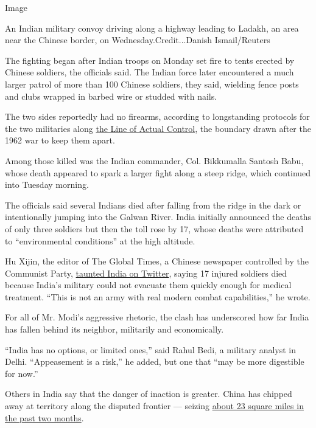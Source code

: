 Image

An Indian military convoy driving along a highway leading to Ladakh, an
area near the Chinese border, on Wednesday.Credit...Danish
Ismail/Reuters

The fighting began after Indian troops on Monday set fire to tents
erected by Chinese soldiers, the officials said. The Indian force later
encountered a much larger patrol of more than 100 Chinese soldiers, they
said, wielding fence posts and clubs wrapped in barbed wire or studded
with nails.

The two sides reportedly had no firearms, according to longstanding
protocols for the two militaries along
\href{https://www.nytimes.com/2020/06/16/world/asia/india-china-border.html}{the
Line of Actual Control}, the boundary drawn after the 1962 war to keep
them apart.

Among those killed was the Indian commander, Col. Bikkumalla Santosh
Babu, whose death appeared to spark a larger fight along a steep ridge,
which continued into Tuesday morning.

The officials said several Indians died after falling from the ridge in
the dark or intentionally jumping into the Galwan River. India initially
announced the deaths of only three soldiers but then the toll rose by
17, whose deaths were attributed to ``environmental conditions'' at the
high altitude.

Hu Xijin, the editor of The Global Times, a Chinese newspaper controlled
by the Communist Party,
\href{https://twitter.com/HuXijin_GT/status/1272973497766051840}{taunted
India on Twitter}, saying 17 injured soldiers died because India's
military could not evacuate them quickly enough for medical treatment.
``This is not an army with real modern combat capabilities,'' he wrote.

For all of Mr. Modi's aggressive rhetoric, the clash has underscored how
far India has fallen behind its neighbor, militarily and economically.

``India has no options, or limited ones,'' said Rahul Bedi, a military
analyst in Delhi. ``Appeasement is a risk,'' he added, but one that
``may be more digestible for now.''

Others in India say that the danger of inaction is greater. China has
chipped away at territory along the disputed frontier --- seizing
\href{https://theprint.in/opinion/china-believes-india-wants-aksai-chin-back-thats-why-it-has-crossed-lac-in-ladakh/430899/}{about
23 square miles in the past two months}.

